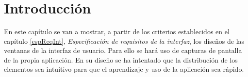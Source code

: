 \section{Introducción}

  \paragraph{}En este capítulo se van a mostrar, a partir de los criterios
  establecidos en el capítulo \ref{espReqInt},
  \textit{Especificación de requisitos de la interfaz}, los diseños de las
  ventanas de la interfaz de usuario. Para ello se hará uso de capturas de
  pantalla de la propia aplicación. En su diseño se ha intentado que la
  distribución de los elementos sea intuitivo para que el aprendizaje y uso de
  la aplicación sea rápido.

